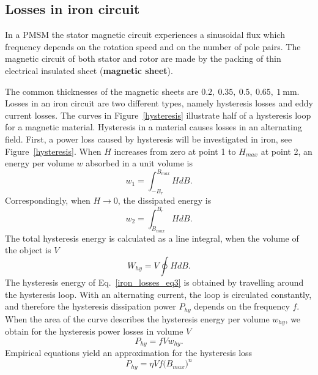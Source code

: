 \documentclass[11pt,a4paper,oneside]{book}
\begin{document}
\begin{onehalfspace}
\subsection{Losses in iron circuit}
In a PMSM the stator magnetic circuit experiences a sinusoidal flux which frequency depends on the rotation speed and on the number of pole pairs. The magnetic circuit of both stator and rotor are made by the packing of thin electrical insulated sheet (\textbf{magnetic sheet}). 

The common thicknesses of the magnetic sheets are $0.2,\ 0.35,\ 0.5,\ 0.65,\ 1\SI{}{\milli\meter}$.
Losses in an iron circuit are two different types, namely hysteresis losses and eddy current losses. The curves in Figure~\ref{hysteresis} illustrate half of a hysteresis loop for a magnetic material. Hysteresis in a material causes losses in an alternating field. First, a power loss caused by hysteresis will be investigated in iron, see Figure~\ref{hysteresis}. When $H$ increases from zero at point 1 to $H_{max}$ at point 2, an energy per volume $w$ absorbed in a unit volume is
\begin{equation}\label{iron_losses_eq1}
	w_1=\int_{-B_r}^{B_{max}}HdB.
\end{equation}
Correspondingly, when $H\rightarrow0$, the dissipated energy is 
\begin{equation}\label{iron_losses_eq2}
	w_2=\int_{B_{max}}^{B_{r}}HdB.
\end{equation}
The total hysteresis energy is calculated as a line integral, when the volume of the object is $V$
\begin{equation}\label{iron_losses_eq3}
	W_{hy} = V\oint{HdB}.
\end{equation}
The hysteresis energy of Eq.~\eqref{iron_losses_eq3} is obtained by travelling around the hysteresis loop. With an alternating current, the loop is circulated constantly, and therefore the hysteresis dissipation power $P_{hy}$ depends on the frequency $f$. When the area of the curve describes the hysteresis energy per volume $w_{hy}$, we obtain for the hysteresis power losses in volume $V$
\begin{equation}\label{iron_losses_eq4}
	P_{hy} = fVw_{hy}.
\end{equation}
Empirical equations yield an approximation for the hysteresis loss
\begin{equation}\label{iron_losses_eq5}
	P_{hy} = \eta V f \Big(B_{max}\Big)^n
\end{equation}
\begin{figure}[H]

\end{figure}
\end{onehalfspace}
\end{document}
